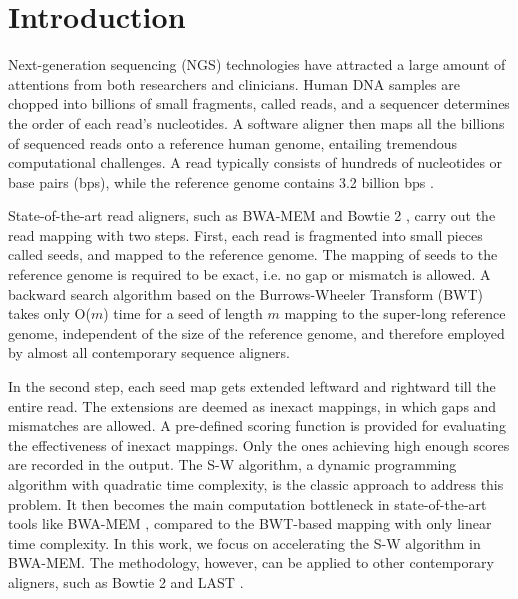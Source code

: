 \section{Introduction} 
\label{sec:introduction}

Next-generation sequencing (NGS) technologies have attracted a large amount of attentions from both researchers and clinicians. 
Human DNA samples are chopped into billions of small fragments, called reads, and a sequencer determines the order of each read's nucleotides. 
A software aligner then maps all the billions of sequenced reads onto a reference human genome, entailing tremendous computational challenges.
A read typically consists of hundreds of nucleotides or base pairs (bps), while the reference genome contains 3.2 billion bps \cite{Mardis2008}.

State-of-the-art read aligners, such as BWA-MEM \cite{BWA-MEM} and Bowtie 2 \cite{Bowtie2}, 
carry out the read mapping with two steps. 
First, each read is fragmented into small pieces called seeds, and mapped to the reference genome. 
The mapping of seeds to the reference genome is required to be exact, i.e. no gap or mismatch is allowed. 
A backward search algorithm based on the Burrows-Wheeler Transform (BWT) \cite{BWT} takes only O($m$) time for a seed of length $m$ mapping to the super-long reference genome, independent of the size of the reference genome, and therefore employed by almost all contemporary sequence aligners.

In the second step, each seed map gets extended leftward and rightward till the entire read. 
The extensions are deemed as inexact mappings, in which gaps and mismatches are allowed. A pre-defined scoring function is provided for evaluating the effectiveness of inexact mappings. Only the ones achieving high enough scores are recorded in the output. 
The S-W algorithm, a dynamic programming algorithm with quadratic time complexity, is the classic approach to address this problem. 
It then becomes the main computation bottleneck in state-of-the-art tools like BWA-MEM \cite{BWA-MEM}, 
compared to the BWT-based mapping with only linear time complexity. 
In this work, we focus on accelerating the S-W algorithm in BWA-MEM. The methodology, however, can be applied to other contemporary aligners, such as Bowtie 2 \cite{Bowtie2} and LAST \cite{LAST}. 

